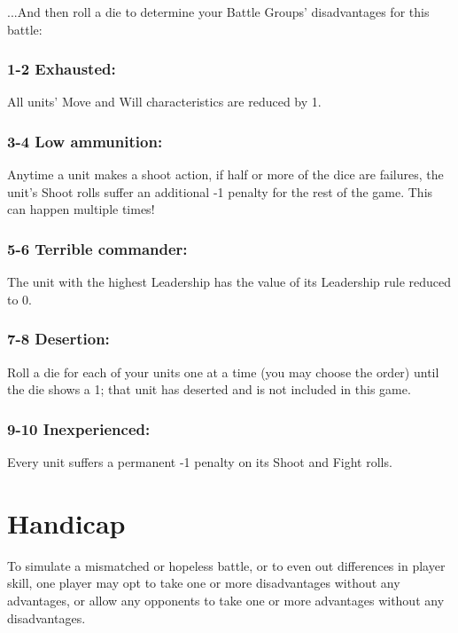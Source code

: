 \begin{multicols}{2}
\vspace{2em}

...And then roll a die to determine your Battle Groups' disadvantages for this battle:

\subsubsection*{1-2 Exhausted:} All units' Move and Will characteristics are reduced by 1.

\subsubsection*{3-4 Low ammunition:} Anytime a unit makes a shoot action, if half or more of the dice are failures, the unit's Shoot rolls suffer an additional -1 penalty for the rest of the game. This can happen multiple times!

\subsubsection*{5-6 Terrible commander:} The unit with the highest Leadership has the value of its Leadership rule reduced to 0.

\subsubsection*{7-8 Desertion:} Roll a die for each of your units one at a time (you may choose the order) until the die shows a 1; that unit has deserted and is not included in this game.

\subsubsection*{9-10 Inexperienced:} Every unit suffers a permanent -1 penalty on its Shoot and Fight rolls.




\section*{Handicap}
To simulate a mismatched or hopeless battle, or to even out differences in player skill, one player may opt to take one or more disadvantages without any advantages,  or allow any opponents to take one or more advantages without any disadvantages.

\end{multicols}

